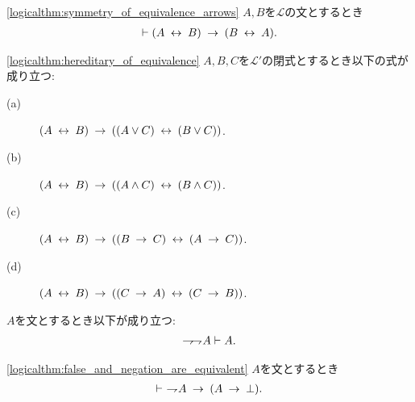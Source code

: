 	\begin{screen}
		\begin{logicalthm}[同値関係の対称律]
		\ref{logicalthm:symmetry_of_equivalence_arrows}
			$A,B$を$\mathcal{L}$の文とするとき
			\begin{align}
				\vdash (A \lrarrow B) \rarrow (B \lrarrow A).
			\end{align}
		\end{logicalthm}
	\end{screen}
	
	\begin{screen}
		\begin{logicalthm}[同値記号の遺伝性質]
		\ref{logicalthm:hereditary_of_equivalence}
			$A,B,C$を$\mathcal{L}'$の閉式とするとき以下の式が成り立つ:
			\begin{description}
				\item[(a)] $(A \lrarrow B) \rarrow ((A \vee C) \lrarrow (B \vee C))$.
				\item[(b)] $(A \lrarrow B) \rarrow ((A \wedge C) \lrarrow (B \wedge C))$.
				\item[(c)] $(A \lrarrow B) \rarrow ((B \rarrow C) \lrarrow (A \rarrow C))$.
				
				\item[(d)] $(A \lrarrow B) \rarrow ((C \rarrow A) \lrarrow (C \rarrow B))$.
			\end{description}
		\end{logicalthm}
	\end{screen}
	
	\begin{screen}
		\begin{logicalaxm}[二重否定の除去]
		\label{logicalaxm:elimination_of_double_negation}
			$A$を文とするとき以下が成り立つ:
			\begin{align}
				\negation \negation A \vdash A.
			\end{align}
		\end{logicalaxm}
	\end{screen}
	
	\begin{screen}
		\begin{logicalthm}[偽な式は矛盾を導く]
		\ref{logicalthm:false_and_negation_are_equivalent}
			$A$を文とするとき
			\begin{align}
				\vdash\ \negation A \rarrow (A \rarrow \bot).
			\end{align}
		\end{logicalthm}
	\end{screen}
	
